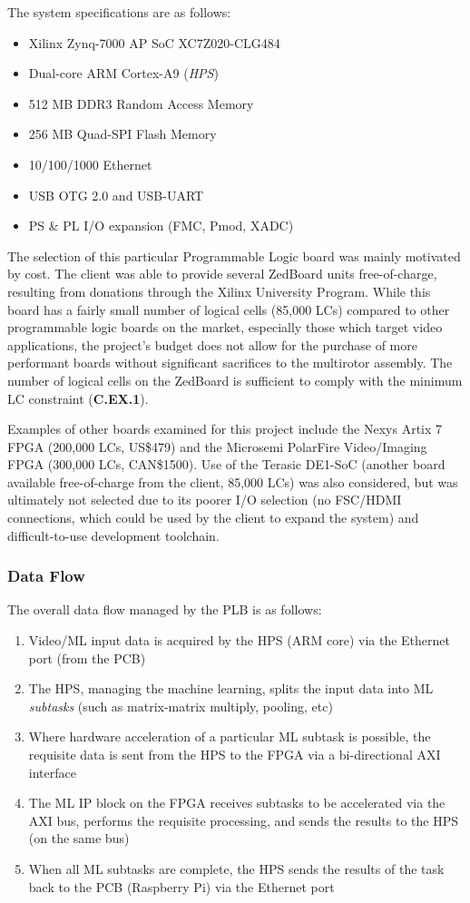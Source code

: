 The system specifications are as follows:
\begin{itemize}
\item Xilinx Zynq-7000 AP SoC XC7Z020-CLG484
\item Dual-core ARM Cortex-A9 (\textit{HPS})
\item 512 MB DDR3 Random Access Memory
\item 256 MB Quad-SPI Flash Memory
\item 10/100/1000 Ethernet 
\item USB OTG 2.0 and USB-UART 
\item PS \& PL I/O expansion (FMC, Pmod, XADC)
\end{itemize}

The selection of this particular Programmable Logic board was mainly motivated by cost. The client was able to provide several ZedBoard units free-of-charge, resulting from donations through the Xilinx University Program. While this board has a fairly small number of logical cells (85,000 LCs) compared to other programmable logic boards on the market, especially those which target video applications, the project's budget does not allow for the purchase of more performant boards without significant sacrifices to the multirotor assembly. The number of logical cells on the ZedBoard is sufficient to comply with the minimum LC constraint (\textbf{C.EX.1}).

Examples of other boards examined for this project include the Nexys Artix 7 FPGA (200,000 LCs, US\$479) and the Microsemi PolarFire Video/Imaging FPGA (300,000 LCs, CAN\$1500). Use of the Terasic DE1-SoC (another board available free-of-charge from the client, 85,000 LCs) was also considered, but was ultimately not selected due to its poorer I/O selection (no FSC/HDMI connections, which could be used by the client to expand the system) and difficult-to-use development toolchain.

\subsubsection{Data Flow}
The overall data flow managed by the PLB is as follows:
\begin{enumerate}
\item Video/ML input data is acquired by the HPS (ARM core) via the Ethernet port (from the PCB)
\item The HPS, managing the machine learning, splits the input data into ML \textit{subtasks} (such as matrix-matrix multiply, pooling, etc)
\item Where hardware acceleration of a particular ML subtask is possible, the requisite data is sent from the HPS to the FPGA via a bi-directional AXI interface
\item The ML IP block on the FPGA receives subtasks to be accelerated via the AXI bus, performs the requisite processing, and sends the results to the HPS (on the same bus)
\item When all ML subtasks are complete, the HPS sends the results of the task back to the PCB (Raspberry Pi) via the Ethernet port
\end{enumerate}

